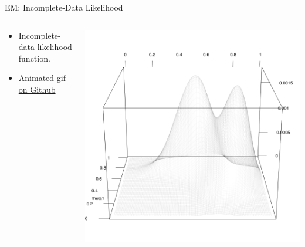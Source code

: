 \documentclass[dvipdfmx,bigger,aspectratio=169]{beamer}
\begin{document}
\begin{frame}[label={sec:orgc6f55ce}]{EM: Incomplete-Data Likelihood}
\begin{columns}
\begin{column}{0.50\columnwidth}
\begin{itemize}
\item Incomplete-data likelihood function.
\item \href{https://github.com/kaz-yos/em\_da\_repo/blob/master/source/em\_rgl.gif}{Animated gif on Github}
\end{itemize}
\end{column}

\begin{column}{0.50\columnwidth}
\begin{center}
\includegraphics[page=1,keepaspectratio,width=\textwidth,height=\textheight]{./source/em_rgl_.png}
\end{center}
\end{column}
\end{columns}
\end{frame}
\end{document}
